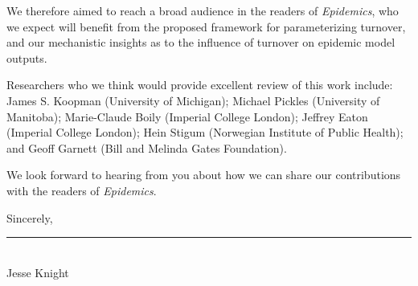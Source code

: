 \documentclass[a4]{article}
\begin{document}
We therefore aimed to reach a broad audience in the readers of \textit{Epidemics},
who we expect will benefit from the proposed framework for parameterizing turnover,
and our mechanistic insights as to the influence of turnover on epidemic model outputs.
\par
Researchers who we think would provide excellent review of this work include:
James S. Koopman (University of Michigan);
Michael Pickles (University of Manitoba);
Marie-Claude Boily (Imperial College London);
Jeffrey Eaton (Imperial College London);
Hein Stigum (Norwegian Institute of Public Health); and
Geoff Garnett (Bill and Melinda Gates Foundation).
\par
We look forward to hearing from you about how we can share our contributions
with the readers of \textit{Epidemics}.
\par
Sincerely,\\[1em]
\rule{0.5\textwidth}{.4pt}\hfil\\
Jesse Knight
\end{document}
